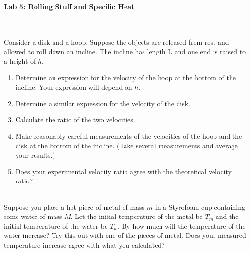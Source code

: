 \documentclass[12pt]{article}
\begin{document}
\pagestyle{empty}

\begin{center}
{\large {\bf Lab 5: Rolling Stuff and Specific Heat}}\\
\smallskip 
\end{center}

\hspace{2mm}\\

\\ 

Consider a disk and a hoop. Suppose the objects are released from rest
and allowed to roll down an incline. The incline has length L and one
end is raised to a height of $h$. 
\begin{enumerate}
\item Determine an expression for the velocity of the hoop at the
  bottom of the incline. Your expression will depend on $h$. 
\item Determine a similar expression for the velocity of the disk.
\item Calculate the ratio of the two velocities. 
\item Make reasonably careful measurements of the velocities of the
  hoop and the disk at the bottom of the incline. (Take several
  measurements and average your results.)  
\item Does your experimental velocity ratio agree with the theoretical
  velocity ratio? \\
\end{enumerate}


\\

Suppose you place a hot piece of metal of mass $m$ in a Styrofoam cup
containing some water of mass $M$.  Let the initial temperature of the
metal be $T_m$ and the initial temperature of the water be $T_w$.  By
how much will the temperature of the water increase?  Try this out
with one of the pieces of metal.  Does your measured temperature
increase agree with what you calculated?
\end{document}
